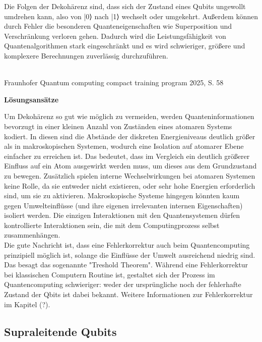 \cite{mermin_quantum_2012}

Die Folgen der Dekohärenz sind, dass sich der Zustand eines Qubits ungewollt umdrehen kann, also von |0⟩ nach |1⟩ wechselt oder umgekehrt. Außerdem können durch Fehler die besonderen Quanteneigenschaften wie Superposition und Verschränkung verloren gehen. Dadurch wird die Leistungsfähigkeit von Quantenalgorithmen stark eingeschränkt und es wird schwieriger, größere und komplexere Berechnungen zuverlässig durchzuführen.

\cite{fraunhofer_iais_quantum_2023}
\cite{nielsen_quantum_2010}\\
Fraunhofer Quantum computing compact training program 2025, S. 58 
 
\textbf{Lösungsansätze }

Um Dekohärenz so gut wie möglich zu vermeiden, werden Quanteninformationen bevorzugt in einer kleinen Anzahl von Zuständen eines atomaren Systems kodiert. In diesen sind die Abstände der diskreten Energieniveaus deutlich größer als in makroskopischen Systemen, wodurch eine  Isolation auf atomarer Ebene einfacher zu erreichen ist. Das bedeutet, dass im Vergleich ein deutlich größerer Einfluss auf ein Atom ausgewirkt werden muss, um dieses aus dem Grundzustand zu bewegen. Zusätzlich spielen interne Wechselwirkungen bei atomaren Systemen keine Rolle, da sie entweder nicht existieren, oder sehr hohe Energien erforderlich sind, um sie zu aktivieren.
Makroskopische Systeme hingegen könnten kaum gegen Umwelteinflüsse (und ihre eigenen irrelevanten internen Eigenschaften) isoliert werden. Die einzigen Interaktionen mit den Quantensystemen dürfen kontrollierte Interaktionen sein, die mit dem Computingprozess selbst zusammenhängen. \\

Die gute Nachricht ist, dass eine Fehlerkorrektur auch beim Quantencomputing prinzipiell möglich ist, solange die Einflüsse der Umwelt ausreichend niedrig sind. Das besagt das sogenannte "Treshold Theorem". Während eine Fehlerkorrektur bei klassischen Computern Routine ist, gestaltet sich der Prozess im Quantencomputing schwieriger: weder der ursprüngliche noch der fehlerhafte Zustand der Qbits ist dabei bekannt. 
Weitere Informationen zur Fehlerkorrektur im Kapitel (?). \\
 
\cite{mermin_quantum_2012}

\subsection{Supraleitende Qubits }

